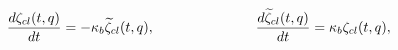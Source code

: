 \begin{equation}
\label{fermiondynamics2classical}
\frac{d\zeta_{cl}(t,q)}{dt} = -\kappa_b{\widetilde \zeta}_{cl}(t,q),
\hspace{1.0in}
\frac{d{\widetilde \zeta}_{cl}(t,q)}{dt} = \kappa_b\zeta_{cl}(t,q),
\end{equation}

